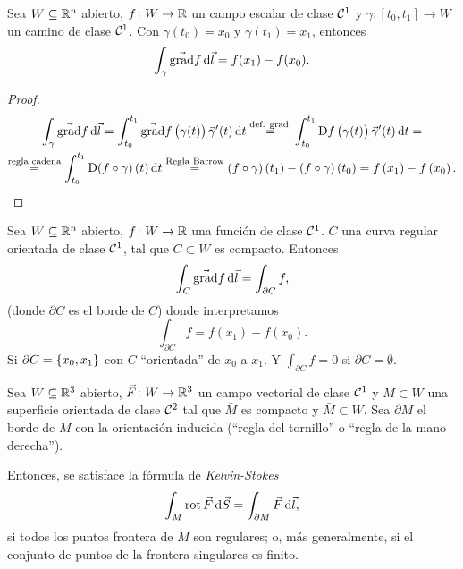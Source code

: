 \begin{prop}
    Sea $W \subseteq \mathbb{R}^n$ abierto, $f \colon W \to \mathbb{R}$ un campo escalar de clase $\mathcal{C}^1$ y $\gamma \colon [t_0,t_1] \to W$
    un camino de clase $\mathcal{C}^1$. Con $\gamma\left( t_0 \right) = x_0$ y $\gamma\left( t_1 \right) = x_1$, entonces
    \[
        \int_\gamma \vec{\grad} f \dif \vec{l} = f(x_1) - f(x_0).
    \]
\end{prop}
\begin{proof}
    \begin{gather*}
        \int_\gamma \vec{\grad} f \dif \vec{l} = \int^{t_1}_{t_0} \vec{\grad} f\left( \gamma(t) \right) \vec{\gamma}^\prime(t) \dif t
        \stackrel{\text{def. grad.}}{=} \int^{t_1}_{t_0} \Dif f\left( \gamma(t) \right) \vec{\gamma}^\prime (t) \dif t = \\
        \stackrel{\text{regla cadena}}{=} \int^{t_1}_{t_0} \Dif \left( f \circ \gamma \right)(t) \dif t \stackrel{\text{Regla Barrow}}{=}
        \left( f \circ \gamma \right)\left( t_1 \right) - \left( f \circ \gamma \right)\left( t_0 \right) = f\left( x_1 \right) - 
        f\left( x_0 \right).
    \end{gather*}
\end{proof}

\begin{teo}
    Sea $W \subseteq \mathbb{R}^n$ abierto, $f \colon W \to \mathbb{R}$ una función de clase $\mathcal{C}^1$. $C$ una curva regular orientada de clase
    $\mathcal{C}^1$, tal que $\bar{C} \subset W$ es compacto. Entonces
    \[
        \int_C \vec{\grad} f \dif \vec{l} = \int_{\partial C} f,
    \]
    (donde $\partial C$ es el borde de $C$) donde interpretamos
    \[
        \int_{\partial C} f = f\left( x_1 \right) - f\left( x_0 \right).
    \]
    Si $\partial C = \left\{x_0, x_1\right\}$ con $C$ ``orientada'' de $x_0$ a $x_1$. Y $\int_{\partial C} f = 0$ si $\partial C = \emptyset$.
\end{teo}
\begin{teo}\label{teo:kelvin-stokes}
    Sea $W \subseteq \mathbb{R}^3$ abierto, $\vec{F} \colon W \to \mathbb{R}^3$ un campo vectorial de clase $\mathcal{C}^1$ y $M \subset W$ una superficie
    orientada de clase $\mathcal{C}^2$ tal que $\bar{M}$ es compacto y $\bar{M} \subset W$. Sea $\partial M$ el borde de $M$ con la orientación
    inducida (``regla del tornillo'' o ``regla de la mano derecha'').

    Entonces, se satisface la fórmula de \emph{Kelvin-Stokes}
    \[
        \int_M \rot \vec{F} \dif \vec{S} = \int_{\partial M} \vec{F} \dif \vec{l},
    \]
    si todos los puntos frontera de $M$ son regulares; o, más generalmente, si el conjunto de puntos de la frontera singulares es finito.
\end{teo}


